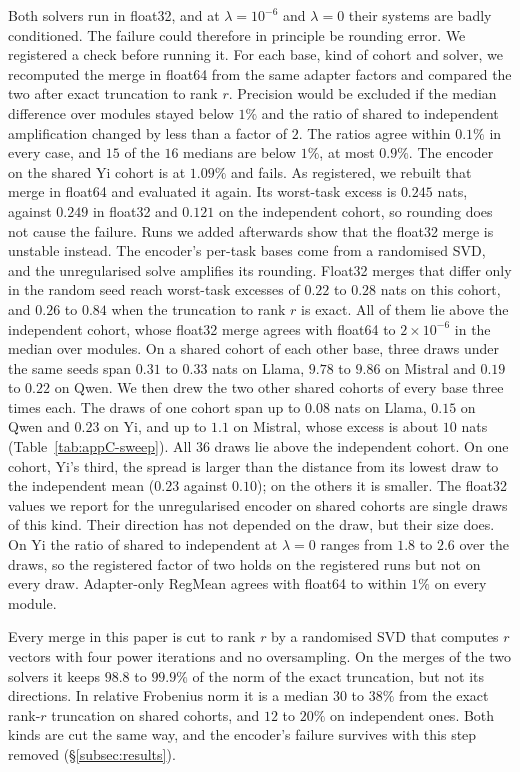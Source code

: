 Both solvers run in float32,
and at $\lambda = 10^{-6}$ and $\lambda = 0$ their systems are badly
conditioned. The failure could therefore in principle be rounding error. We
registered a check before running it. For each base, kind of cohort and solver, we
recomputed the merge in float64 from the same adapter factors and compared the
two after exact truncation to rank $r$. Precision would be excluded if the
median difference over modules stayed below $1\%$ and the ratio of shared to
independent amplification changed by less than a factor of $2$. The ratios
agree within $0.1\%$ in every case, and $15$ of the $16$ medians are below
$1\%$, at most $0.9\%$. The encoder on the shared Yi cohort is at $1.09\%$
and fails. As registered, we rebuilt that merge in float64 and evaluated it
again. Its worst-task excess is $0.245$ nats, against $0.249$ in float32 and
$0.121$ on the independent cohort, so rounding does not cause the failure.
Runs we added afterwards show that the float32 merge is unstable instead. The
encoder's per-task bases come from a randomised SVD, and the unregularised
solve amplifies its rounding. Float32 merges that differ only in the random
seed reach worst-task excesses of $0.22$ to $0.28$ nats on this cohort, and
$0.26$ to $0.84$ when the truncation to rank $r$ is exact. All of them lie
above the independent cohort, whose float32 merge agrees with float64 to
$2\times10^{-6}$ in the median over modules. On a shared cohort of each other
base, three draws under the same seeds span $0.31$ to $0.33$ nats on Llama,
$9.78$ to $9.86$ on Mistral and $0.19$ to $0.22$ on Qwen. We then drew the
two other shared cohorts of every base three times each. The draws of one
cohort span up to $0.08$ nats on Llama, $0.15$ on Qwen and $0.23$ on Yi, and
up to $1.1$ on Mistral, whose excess is about $10$ nats
(Table~\ref{tab:appC-sweep}). All $36$ draws lie above the independent cohort.
On one cohort, Yi's third, the spread is larger than the distance from its
lowest draw to the independent mean ($0.23$ against $0.10$); on the others it
is smaller. The float32 values we report for the unregularised encoder on
shared cohorts are single draws of this kind. Their direction has not
depended on the draw, but their size does. On Yi the ratio of shared to
independent at $\lambda = 0$ ranges from $1.8$ to $2.6$ over the draws, so
the registered factor of two holds on the registered runs but not on every
draw.
Adapter-only RegMean agrees with float64 to within $1\%$ on every module.

Every merge in this paper is cut to rank $r$ by a randomised SVD that computes
$r$ vectors with four power iterations and no oversampling. On the merges of
the two solvers it keeps $98.8$ to $99.9\%$ of the norm of the exact
truncation, but not its directions. In relative Frobenius norm it is a median
$30$ to $38\%$ from the exact rank-$r$ truncation on shared cohorts, and $12$
to $20\%$ on independent ones. Both kinds are cut the same way, and the
encoder's failure survives with this step removed (\S\ref{subsec:results}).


